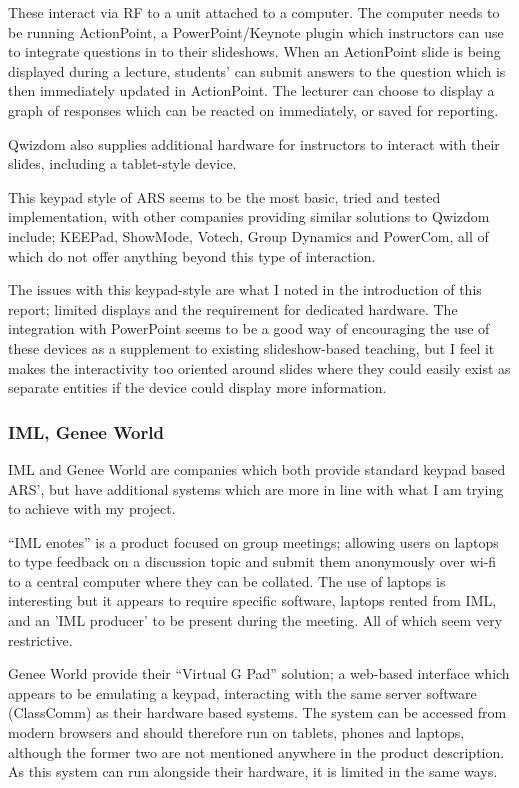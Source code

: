 \documentclass[a4papert,11pt,notitlepage]{ltxdoc}
\begin{document}
These interact via RF to a unit attached to a computer. The computer needs to be running ActionPoint, a PowerPoint/Keynote plugin which instructors can use to integrate questions in to their slideshows. When an ActionPoint slide is being displayed during a lecture, students' can submit answers to the question which is then immediately updated in ActionPoint. The lecturer can choose to display a graph of responses which can be reacted on immediately, or saved for reporting.

Qwizdom also supplies additional hardware for instructors to interact with their slides, including a tablet-style device.

This keypad style of ARS seems to be the most basic, tried and tested implementation, with other companies providing similar solutions to Qwizdom include; KEEPad, ShowMode, Votech, Group Dynamics and PowerCom, all of which do not offer anything beyond this type of interaction.

The issues with this keypad-style are what I noted in the introduction of this report; limited displays and the requirement for dedicated hardware. The integration with PowerPoint seems to be a good way of encouraging the use of these devices as a supplement to existing slideshow-based teaching, but I feel it makes the interactivity too oriented around slides where they could easily exist as separate entities if the device could display more information.

\subsubsection{IML, Genee World}
IML and Genee World are companies which both provide standard keypad based ARS', but have additional systems which are more in line with what I am trying to achieve with my project.

``IML enotes'' is a product focused on group meetings; allowing users on laptops to type feedback on a discussion topic and submit them anonymously over wi-fi to a central computer where they can be collated. The use of laptops is interesting but it appears to require specific software, laptops rented from IML, and an 'IML producer' to be present during the meeting. All of which seem very restrictive.

Genee World provide their ``Virtual G Pad'' solution; a web-based interface which appears to be emulating a keypad, interacting with the same server software (ClassComm) as their hardware based systems. The system can be accessed from modern browsers and should therefore run on tablets, phones and laptops, although the former two are not mentioned anywhere in the product description. As this system can run alongside their hardware, it is limited in the same ways.
\end{document}

